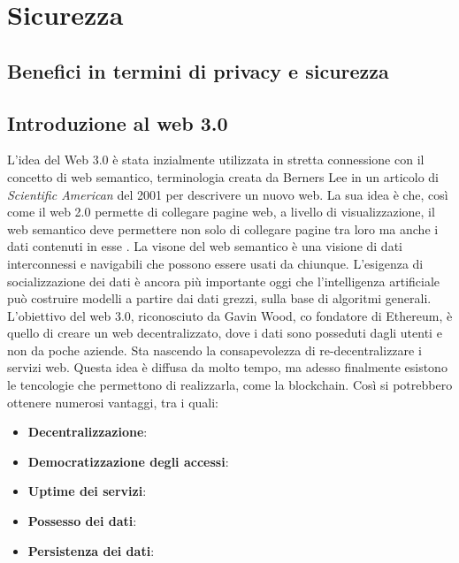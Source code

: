 \chapter{Sicurezza}
\section{Benefici in termini di privacy e sicurezza}

\section{Introduzione al web 3.0}
L'idea del Web 3.0 è stata inzialmente utilizzata in stretta connessione con il concetto di web semantico, terminologia creata da Berners Lee in un articolo di \textit{Scientific American} del 2001 per descrivere un nuovo web. 
La sua idea è che, così come il web 2.0 permette di collegare pagine web, a livello di visualizzazione, il web semantico deve permettere non solo di collegare pagine tra loro ma anche i dati contenuti in esse \cite{ted_youtube}.
La visone del web semantico è una visione di dati interconnessi e navigabili che possono essere usati da chiunque. L'esigenza di socializzazione dei dati è ancora più importante oggi che l'intelligenza artificiale può costruire modelli a partire dai dati grezzi, sulla base di algoritmi generali.
L'obiettivo del web 3.0, riconosciuto da Gavin Wood, co fondatore di Ethereum, è quello di creare un web decentralizzato, dove i dati sono posseduti dagli utenti e non da poche aziende. Sta nascendo la consapevolezza di re-decentralizzare i servizi web.
Questa idea è diffusa da molto tempo, ma adesso finalmente esistono le tencologie che permettono di realizzarla, come la blockchain.
Così si potrebbero ottenere numerosi vantaggi, tra i quali:
\begin{itemize}
    \item \textbf{Decentralizzazione}:
    \item \textbf{Democratizzazione degli accessi}: 
    \item \textbf{Uptime dei servizi}: 
    \item \textbf{Possesso dei dati}: 
    \item \textbf{Persistenza dei dati}:
\end{itemize}